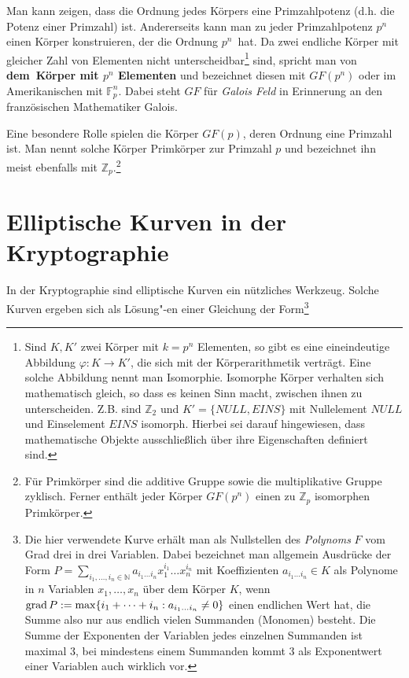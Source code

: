 \begin{refsegment}
Man kann zeigen, dass die Ordnung jedes Körpers eine Primzahlpotenz (d.h. die Potenz einer Primzahl) ist. Andererseits kann man zu jeder Primzahlpotenz $p^n$ einen Körper konstruieren, der die Ordnung $p^n$~hat. Da zwei endliche Körper mit gleicher Zahl von Elementen nicht unterscheidbar\footnote{Sind $K,K'$ zwei Körper mit $k=p^n$ Elementen, so gibt es eine eineindeutige Abbildung $\varphi:K\to K'$, die sich mit der Körperarithmetik verträgt. Eine solche Abbildung nennt man Isomorphie. Isomorphe Körper verhalten sich mathematisch gleich, so dass es keinen Sinn macht, zwischen ihnen zu unterscheiden. Z.B. sind ${\mathbb Z}_2$ und $K'=\{ NULL,EINS\}$ mit Nullelement $NULL$ und Einselement $EINS$ isomorph. Hierbei sei darauf hingewiesen, dass mathematische Objekte ausschließlich über ihre Eigenschaften definiert sind.} sind, spricht man von \textbf{dem\ Körper mit $p^n$ Elementen} und bezeichnet diesen mit $GF(p^n)$ oder im Amerikanischen mit
$\mathbb{F}_p^{n}$. Dabei steht $GF$ für {\it Galois Feld} in Erinnerung an den französischen Mathematiker Galois.

Eine besondere Rolle spielen die Körper $GF(p)$, deren Ordnung eine Primzahl ist. Man
nennt solche Körper Primkörper zur Primzahl $p$ und bezeichnet ihn meist ebenfalls
mit ${\mathbb Z}_p$.\footnote{%
  Für Primkörper sind die additive Gruppe sowie die multiplikative Gruppe zyklisch.
  Ferner enthält jeder Körper $GF(p^n)$ einen zu ${\mathbb Z}_p$ isomorphen Primkörper.
}


\section{Elliptische Kurven in der Kryptographie} \label{ECC-Crypto}

In der Kryptographie sind elliptische Kurven ein nützliches Werkzeug. Solche Kurven
ergeben sich als Lösung"-en einer Gleichung der Form\footnote{%
  Die hier verwendete Kurve erhält man als Nullstellen des {\it Polynoms}
  $F$ vom Grad drei in drei Variablen. Dabei bezeichnet man allgemein Ausdrücke der Form
  $P=\sum_{i_1,\dots,i_n\in\mathbb{N}} a_{i_1\dots i_n} x_1^{i_1}\dots x_n^{i_n}$
  mit Koeffizienten $a_{i_1\dots i_n}\in K$ als Polynome in $n$ Variablen $x_1,\dots,x_n$
  über dem Körper $K$, wenn ${\rm grad\,} P:=\max\{i_1+\dots +i_n: a_{i_1\dots i_n}\ne 0\}$
  einen endlichen Wert hat, die Summe also nur aus endlich vielen Summanden (Monomen) besteht.
  Die Summe der Exponenten der Variablen jedes einzelnen Summanden ist maximal $3$,
  bei mindestens einem Summanden kommt $3$ als Exponentwert einer Variablen auch wirklich vor.
}


\end{refsegment}
